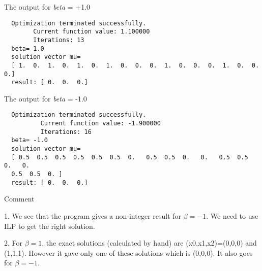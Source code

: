 \documentclass[12pt,a4paper]{scrartcl}
\begin{document}
The output for \textit{beta} = +1.0
\begin{verbatim}
  Optimization terminated successfully.
        Current function value: 1.100000    
        Iterations: 13
  beta= 1.0
  solution vector mu=
  [ 1.  0.  1.  0.  1.  0.  1.  0.  0.  0.  1.  0.  0.  0.  1.  0.  0.  0.]
  result: [ 0.  0.  0.]
\end{verbatim}

The output for \textit{beta} = -1.0
\begin{verbatim}
  Optimization terminated successfully.
          Current function value: -1.900000   
          Iterations: 16
  beta= -1.0
  solution vector mu=
  [ 0.5  0.5  0.5  0.5  0.5  0.5  0.   0.5  0.5  0.   0.   0.5  0.5  0.   0.
  0.5  0.5  0. ]
  result: [ 0.  0.  0.]
\end{verbatim}

Comment


1. We see that the program gives a non-integer result for $\beta=-1$. We need to use ILP to get the right solution.

2. For \(\beta=1\), the exact solutions (calculated by hand) are (x0,x1,x2)=(0,0,0) and (1,1,1). However it gave only one of these solutions which is (0,0,0). It also goes for \(\beta=-1\).

\clearpage

\end{document}
